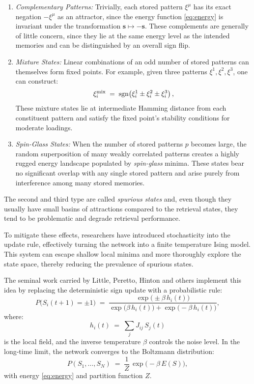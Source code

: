 \documentclass[a4paper,12pt]{report}
\begin{document}
\begin{enumerate}
  \item \emph{Complementary Patterns:}  
    Trivially, each stored pattern \(\xi^\mu\) has its exact negation \(-\xi^\mu\) as 
    an attractor, since the energy function \eqref{eq:energy} is invariant under the 
    transformation \(\mathbf{s}\mapsto -\mathbf{s}\).  These complements are generally 
    of little concern, since they lie at the same energy level as the intended 
    memories and can be distinguished by an overall sign flip.

  \item \emph{Mixture States:}
    Linear combinations of an odd number of stored patterns can themselves form fixed 
    points\cite{PhysRevA.32.1007}. For example, given three patterns 
    \(\xi^1,\xi^2,\xi^3\), one can construct:
    \[
      \xi_i^{\rm mix} \;=\; \mathrm{sgn}\bigl(\xi_i^1 \pm \xi_i^2 \pm \xi_i^3\bigr)\,,
    \] 
    These mixture states lie at intermediate Hamming distance from each 
    constituent pattern and satisfy the fixed point's stability conditions for 
    moderate loadings.

  \item \emph{Spin-Glass States:}
    When the number of stored patterns \(p\) becomes large, the random superposition of 
    many weakly correlated patterns creates a highly rugged energy landscape populated 
    by {\em spin-glass} minima\cite{PhysRevLett.55.1530}. These states bear no 
    significant overlap with any single stored pattern and arise purely from 
    interference among many stored memories.
\end{enumerate}

The second and third type are called \emph{spurious states} and, even though they 
usually have small basins of attractions compared to the retrieval states, they tend 
to be problematic and degrade retrieval performance.

To mitigate these effects, researchers have introduced stochasticity into the update 
rule, effectively turning the network into a finite temperature Ising model.  
This system can escape shallow local minima and more thoroughly explore the state 
space, thereby reducing the prevalence of spurious states.

The seminal work carried by Little, Peretto, Hinton and others 
\cite{LITTLE1974101, Hinton1983, Peretto1984} implement this idea by replacing the 
deterministic sign update with a probabilistic rule:
\[
P\bigl(S_i(t+1) = \pm1\bigr)
\;=\;
\frac{\exp\bigl(\pm \beta\,h_i(t)\bigr)}
     {\exp\bigl(\beta\,h_i(t)\bigr) + \exp\bigl(-\beta\,h_i(t)\bigr)},
\]
where:
\[
h_i(t) \;=\;\sum_{j} J_{ij}\,S_j(t)
\]
is the local field, and the inverse temperature \(\beta\) controls the noise level.  
In the long-time limit, the network converges to the Boltzmann distribution:
\[
P(S_1,\dots,S_N)
\;=\;
\frac{1}{Z}\,\exp\bigl(-\beta\,E(S)\bigr),
\]
with energy \ref{eq:energy} and partition function \(Z\).
\end{document}

